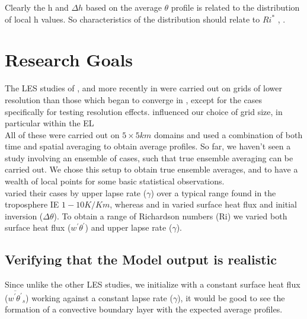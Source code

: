 Clearly the h and $\Delta h$ based on the average $\theta$ profile is related to the distribution of local h values. So characteristics of the distribution should relate to $Ri^{*}$ \cite{SullMoengStev}, \cite{BrooksFowler2}.  

\section{Research Goals}
\label{sec:ResearchGoals}

The LES studies of \citeauthor{SullMoengStev} \cite{SullMoengStev}, \citeauthor{FedConzMir04} \cite{FedConzMir04} and more recently \citeauthor{BrooksFowler2} in \cite{BrooksFowler2} were carried out on grids of lower resolution than those which began to converge in \citeauthor{SullPat} \cite{SullPat}, except for the cases specifically for testing resolution effects. \citeauthor{SullPat} \cite{SullPat} influenced our choice of grid size, in particular within the \acs{EL}\\

 All of these were carried out on $5 \times 5 km$ domains and used a combination of both time and spatial averaging to obtain average profiles.  So far, we haven't seen a study involving an ensemble of cases, such that true ensemble averaging can be carried out.  We chose this setup to obtain true ensemble averages, and to have a wealth of local points for some basic statistical observations.\\

\citeauthor{FedConzMir04} \cite{FedConzMir04} varied their cases by upper lapse rate ($\gamma$) over a typical range found in the troposphere IE $1 - 10 K / Km$, whereas \citeauthor{SullMoengStev} \cite{SullMoengStev} and \citeauthor{BrooksFowler2} in \cite{BrooksFowler2} varied surface heat flux and initial inversion ($\Delta \theta$).  To obtain a range of Richardson numbers (\acs{Ri}) we varied both surface heat flux ($w^{'}\theta^{'}$) and upper lapse rate ($\gamma$).\\

\subsection{Verifying that the Model output is realistic}

Since unlike the other LES studies, we initialize with a constant surface heat flux ($\overline{w^{'}\theta^{'}}_{s}$) working against a constant lapse rate ($\gamma$), it would be good to see the formation of a convective boundary layer with the expected average profiles.\\

